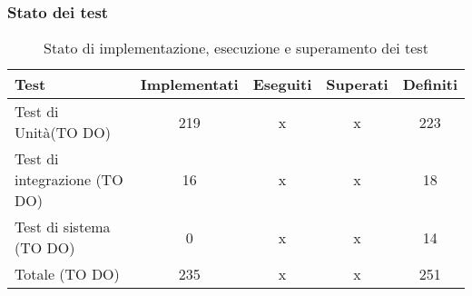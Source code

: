 \documentclass[PdQ.tex]{subfiles}
\begin{document}
\subsubsection{Stato dei test}
	\begin{table}[h]
				\centering
				\begin{tabular}{l c c c c}
					\hline
					\rule[-0.3cm]{0cm}{0.8cm}
					\textbf{Test} & \textbf{Implementati} & \textbf{Eseguiti} & \textbf{Superati} & \textbf{Definiti}\\
					\hline
					\rule[0cm]{0cm}{0.4cm}
					Test di Unità(TO DO) & 219 & x & x & 223  \\
					\rule[0cm]{0cm}{0.4cm}
					Test di integrazione (TO DO) & 16 & x & x & 18 \\
					\rule[0cm]{0cm}{0.4cm}
					Test di sistema (TO DO) & 0 & x & x & 14  \\
					\rule[0cm]{0cm}{0.4cm}
					Totale (TO DO) & 235 & x & x & 251  \\
					\hline
				\end{tabular}
				\caption{Stato di implementazione, esecuzione e superamento dei test}
			\end{table}
\end{document}
